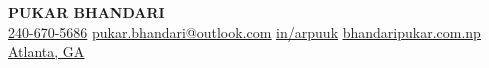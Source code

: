 \begin{center}
    \textbf{\Huge \scshape PUKAR BHANDARI} \\ \vspace{1pt}
    \href{tel:+12406705686} { \small 240-670-5686} \quad
    \href{mailto:pukar.bhandari@outlook.com}{ \underline{pukar.bhandari@outlook.com}} \quad
    \href{https://www.linkedin.com/in/arpuuk}{ \underline{in/arpuuk}} \quad
    \href{https://www.bhandaripukar.com.np/}{ \underline{bhandaripukar.com.np}} \quad
    \href{https://maps.app.goo.gl/iWAs9WEaQU7Ayv4x5}{\faMapMarker* \underline{Atlanta, GA}} \quad
\end{center}